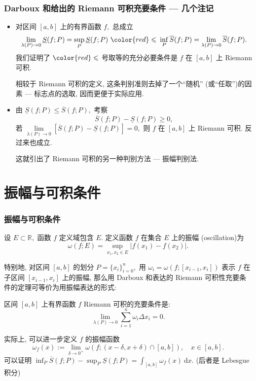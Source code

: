 
\begin{frame}
\frametitle{Darboux 和给出的 Riemann 可积充要条件 --- 几个注记}

\begin{itemize}
\item 对区间 $[a, b]$ 上的有界函数 $f,$ 总成立
\[
\lim\limits_{\lambda(P) \to 0} \underline{S}(f; P) = \sup_P \underline{S}(f; P) ~ {\color{red}\leqslant} ~ \inf_P \overline{S}(f; P) = \lim\limits_{\lambda(P) \to 0} \overline{S}(f; P).
\]
我们证明了 $\color{red} \leqslant$ 号取等的充分必要条件是 $f$ 在 $[a,b]$ 上 Riemann 可积.

相较于 Riemann 可积的定义, 这条判别准则\alert{去掉了一个``随机'' (或``任取'')的因素} --- 标志点的选取, 因而更便于实际应用.
\item 由 $\underline{S}(f; P) \leqslant \overline{S}(f; P),$ 考察
\[
\overline{S}(f; P) - \underline{S}(f; P) \geqslant 0,
\]
若 $\lim\limits_{\lambda(P) \to 0} [\overline{S}(f; P) - \underline{S}(f; P)] = 0,$ 则 $f$ 在 $[a,b]$ 上 Riemann 可积. 反过来也成立.

这就引出了 Riemann 可积的另一种判别方法 --- 振幅判别法.
\end{itemize}

\end{frame}


\section{振幅与可积条件}


\begin{frame}
\frametitle{振幅与可积条件}

\begin{Def}[振幅]
设 $E \subset \mathbb{R},$ 函数 $f$ 定义域包含 $E.$ 定义函数 $f$ 在集合 $E$ 上的\alert{振幅 (oscillation)}为
\[
\omega(f; E) = \sup_{x_1, x_2 \in E} |f(x_1) - f(x_2)|.
\]
\end{Def}

\pause

特别地, 对区间 $[a, b]$ 的划分 $P = \{x_i\}_{i=0}^n,$ 用 $\omega_i = \omega(f; [x_{i-1}, x_i])$ 表示 $f$ 在子区间 $[x_{i-1}, x_i]$ 上的振幅, 那么用 Darboux 和表达的 Riemann 可积性充要条件的定理可等价为用振幅表达的形式:

\pause

\begin{thm}[振幅判别法]
区间 $[a,b]$ 上有界函数 $f$ Riemann 可积的充要条件是:
\[\lim_{\lambda(P) \to 0} \sum_{i=1}^n \omega_i \Delta x_i = 0.\]
\end{thm}

\pause

实际上, 可以进一步定义 $f$ 的振幅函数
\[
\omega_f(x) := \lim_{\delta \to 0^+} \omega(f; (x - \delta, x + \delta) \cap [a,b]), \quad x \in [a,b].
\]
可以证明 $\inf_P \overline{S}(f; P) - \sup_P \underline{S}(f; P) = \int_{[a, b]} \omega_f(x) ~ \mathrm{d} x.$ (后者是 Lebesgue 积分)

\end{frame}

